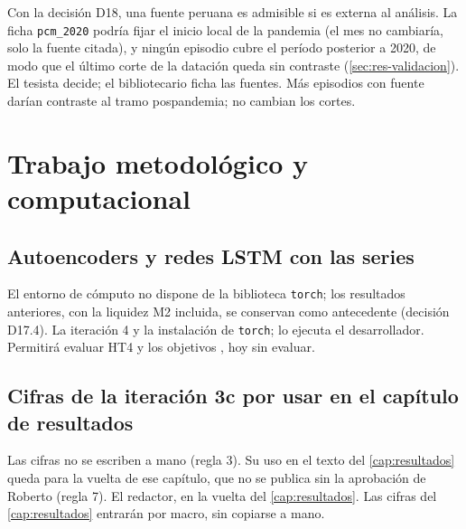 {Con la decisión D18, una fuente peruana es admisible si es externa al análisis. La ficha
\texttt{pcm\_2020} podría fijar el inicio local de la pandemia (el mes no cambiaría, solo la fuente
citada), y ningún episodio cubre el período posterior a 2020, de modo que el último corte de la
datación queda sin contraste (\cref{sec:res-validacion}).}
{El tesista decide; el bibliotecario ficha las fuentes.}
{Más episodios con fuente darían contraste al tramo pospandemia; no cambian los cortes.}

\section{Trabajo metodológico y computacional}
\label{sec:pend-metodo}

\subsection{Autoencoders y redes LSTM con las \texorpdfstring{\nSeries{}}{16} series}
\label{sec:pend-dl}

{El entorno de cómputo no dispone de la biblioteca \texttt{torch}; los resultados anteriores, con la
liquidez M2 incluida, se conservan como antecedente (decisión D17.4).}
{La iteración 4 y la instalación de \texttt{torch}; lo ejecuta el desarrollador.}
{Permitirá evaluar HT4 y los objetivos , hoy sin
evaluar.}

\subsection{Cifras de la iteración 3c por usar en el capítulo de resultados}
\label{sec:pend-cifras}

{Las cifras no se escriben a mano (regla 3). Su uso en el texto del \cref{cap:resultados} queda
para la vuelta de ese capítulo, que no se publica sin la aprobación de Roberto (regla 7).}
{El redactor, en la vuelta del \cref{cap:resultados}.}
{Las cifras del \cref{cap:resultados} entrarán por macro, sin copiarse a mano.}

